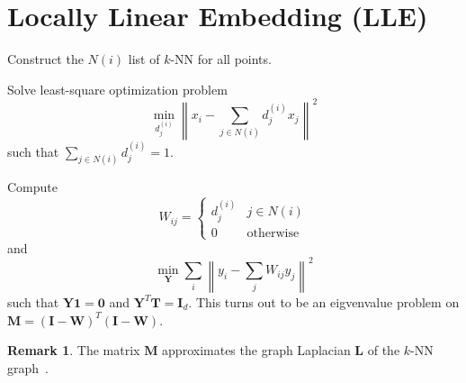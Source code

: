 \documentclass[11pt]{article}
\newcommand{\norm}[1]{\left\lVert#1\right\rVert}
\theoremstyle{definition}
\newtheorem{remark}{Remark}
\begin{document}
\section{Locally Linear Embedding (LLE)} 
\begin{steps}
    \item Construct the $N(i)$ list of $k$-NN for all points.
    \item Solve least-square optimization problem
        \[
            \min _{d_j^{(i)}} \norm{x_i- \sum_{j\in N(i)} d_j^{(i)} x_j}^2
        \]
        such that $\sum_{j\in N(i)} d_j^{(i)} =1$.
    \item Compute 
        \[
            W_{ij} = \begin{cases}
                d_j^{(i)} & j\in N(i)\\
                0 & \text{otherwise}
            \end{cases}
        \]
        and 
    \[
        \min _{\bm{Y}} \sum_{i} \norm{y_i -\sum_j W_{ij}y_j}^2
    \]
    such that $\bm{Y}\bm{1}=\bm{0}$ and $\bm{Y}^T\bm{T}=\bm{I}_d$. This turns out to be an eigvenvalue problem on $\bm{M}=(\bm{I}-\bm{W})^T(\bm{I}-\bm{W})$.
\end{steps}
\begin{remark}
    The matrix $\bm{M}$ approximates the graph Laplacian $\bm{L}$ of the $k$-NN graph~\cite{belkin2007convergence}.
\end{remark}
\end{document}
